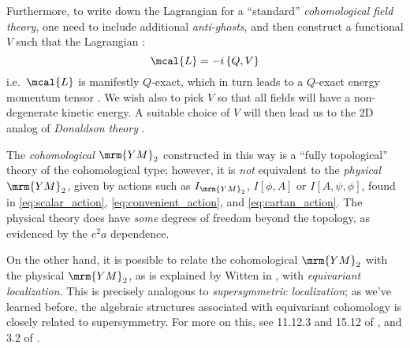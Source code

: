 \documentclass[a4paper
	,10pt
]{article}
\newcommand{\YM}{{\ensuremath{\mrm{YM}_2}}\xspace}
\begin{document}
	Furthermore, to write down the Lagrangian for a ``standard'' \textit{cohomological field theory}, one need to include additional \textit{anti-ghosts}, and then construct a functional $V$ such that the Lagrangian \cite{Witten:1992xu}:
	\begin{equation}
		\mcal{L} = -i\,\{Q,V\}
	\label{eq:coh_action}
	\end{equation}
	i.e.~$\mcal{L}$ is manifestly $Q$-exact, which in turn leads to a $Q$-exact energy momentum tensor \cite{Cordes:1994fc}. We wish also to pick $V$ so that all fields will have a non-degenerate kinetic energy. A suitable choice of $V$ will then lead us to the 2D analog of \textit{Donaldson theory} \cite{Witten:1992xu}. 
	
	The \textit{cohomological \YM} constructed in this way is a ``fully topological'' theory of the cohomological type; however, it is \textit{not} equivalent to the \textit{physical \YM}, given by actions such as $I_\YM$, $I[\phi,A]$ or $I[A,\psi,\phi]$, found in \eqref{eq:scalar_action}, \eqref{eq:convenient_action}, and \eqref{eq:cartan_action}. The physical theory does have \textit{some} degrees of freedom beyond the topology, as evidenced by the $e^2 a$ dependence. 
	
	On the other hand, it is possible to relate the cohomological \YM with the physical \YM, as is explained by Witten in \cite{Witten:1992xu}, with \textit{equivariant localization}. This is precisely analogous to \textit{supersymmetric localization}; as we've learned before, the algebraic structures associated with equivariant cohomology is closely related to supersymmetry. For more on this, see 11.12.3 and 15.12 of \cite{Cordes:1994fc}, and 3.2 of \cite{Witten:1992xu}. 



\vspace{1.2\baselineskip}
\raggedright
\printbibliography[%
	,heading = bibintoc
]
\end{document}
